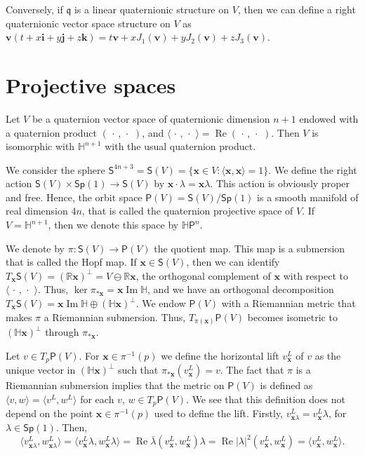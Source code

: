 \documentclass[12pt, a4paper]{amsart}
\newcommand{\g}{\mathfrak}
\newcommand{\R}{\mathbb{R}}
\renewcommand{\H}{\mathbb{H}}
\renewcommand{\Re}{\operatorname{Re}}
\renewcommand{\Im}{\operatorname{Im}}
\theoremstyle{remark}
\begin{document}
Conversely, if $\g{q}$ is a linear quaternionic structure on $V$, then we can define a right quaternionic vector space structure on $V$ as $\mathbf{v}(t+x\mathbf{i}+y\mathbf{j}+z\mathbf{k})=t\mathbf{v}+xJ_1(\mathbf{v})+yJ_2(\mathbf{v})+zJ_3(\mathbf{v})$.

\section{Projective spaces}

Let $V$ be a quaternion vector space of quaternionic dimension $n+1$ endowed with a quaternion product $(\,\cdot\,,\,\cdot\,\,)$, and $\langle\,\cdot\,,\,\cdot\,\,\rangle=\Re(\,\cdot\,,\,\cdot\,\,)$.
Then $V$ is isomorphic with $\H^{n+1}$ with the usual quaternion product.

We consider the sphere $\mathsf{S}^{4n+3}=\mathsf{S}(V)=\{\mathbf{x}\in V:\langle\mathbf{x},\mathbf{x}\rangle=1\}$.
We define the right action $\mathsf{S}(V)\times\mathsf{Sp}(1)\to\mathsf{S}(V)$ by $\mathbf{x}\cdot \lambda=\mathbf{x}\lambda$.
This action is obviously proper and free. 
Hence, the orbit space $\mathsf{P}(V)=\mathsf{S}(V)/\mathsf{Sp}(1)$ is a smooth manifold of real dimension $4n$, that is called the quaternion projective space of $V$.
If $V=\H^{n+1}$, then we denote this space by $\H \mathsf{P}^n$.

We denote by $\pi\colon\mathsf{S}(V)\to\mathsf{P}(V)$ the quotient map.
This map is a submersion that is called the Hopf map.
If $\mathbf{x}\in\mathsf{S}(V)$, then we can identify $T_\mathbf{x}\mathsf{S}(V)=(\R\mathbf{x})^\perp=V\ominus\R\mathbf{x}$, the orthogonal complement of $\mathbf{x}$ with respect to $\langle\,\cdot\,,\,\cdot\,\,\rangle$.
Thus, $\ker\pi_{*\mathbf{x}}=\mathbf{x}\Im\H$, and we have an orthogonal decomposition $T_\mathbf{x}\mathsf{S}(V)=\mathbf{x}\Im\H\oplus(\H\mathbf{x})^\perp$.
We endow $\mathsf{P}(V)$ with a Riemannian metric that makes $\pi$ a Riemannian submersion.
Thus, $T_{\pi(\mathbf{x})}\mathsf{P}(V)$ becomes isometric to $(\H\mathbf{x})^\perp$ through $\pi_{*\mathbf{x}}$.

Let $v\in T_{p}\mathsf{P}(V)$.
For $\mathbf{x}\in\pi^{-1}(p)$ we define the horizontal lift $v^L_\mathbf{x}$ of $v$ as the unique vector in $(\H\mathbf{x})^\perp$ such that $\pi_{*\mathbf{x}}(v^L_\mathbf{x})=v$.
The fact that $\pi$ is a Riemannian submersion implies that the metric on $\mathsf{P}(V)$ is defined as 
$\langle v,w\rangle=\langle v^L,w^L\rangle$ for each $v$, $w\in T_p\mathsf{P}(V)$.
We see that this definition does not depend on the point $\mathbf{x}\in\pi^{-1}(p)$ used to define the lift.
Firstly, $v^L_{\mathbf{x}\lambda}=v^L_\mathbf{x}\lambda$, for $\lambda\in\mathsf{Sp}(1)$. Then,
\[
\langle v^L_{\mathbf{x}\lambda},w^L_{\mathbf{x}\lambda}\rangle=
\langle v^L_{\mathbf{x}}\lambda,w^L_{\mathbf{x}}\lambda\rangle=
\Re\bar{\lambda}(v^L_\mathbf{x},w^L_\mathbf{x})\lambda=
\Re\lvert\lambda\rvert^2(v^L_\mathbf{x},w^L_\mathbf{x})=
\langle v^L_{\mathbf{x}},w^L_{\mathbf{x}}\rangle.
\]
\end{document}
